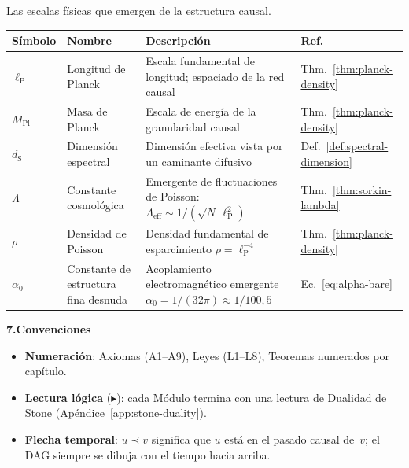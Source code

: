 \documentclass[11pt, a4paper, openany]{book}
\newcommand{\lP}{\ell_{\mathrm{P}}}
\newcommand{\dS}{d_{\mathrm{S}}}
\newcommand{\MPl}{M_{\mathrm{Pl}}}
\begin{document}
\smallskip\noindent
Las escalas f\'isicas que emergen de la estructura causal.

\smallskip
\begin{tabular}{@{}l@{\;\;}l@{\;\;}p{5.2cm}@{\;\;}l@{}}
\toprule
\textbf{S\'imbolo} & \textbf{Nombre} & \textbf{Descripci\'on} & \textbf{Ref.} \\
\midrule
$\lP$ & Longitud de Planck &
  Escala fundamental de longitud; espaciado de la red causal &
  Thm.~\ref{thm:planck-density} \\[3pt]
$\MPl$ & Masa de Planck &
  Escala de energ\'ia de la granularidad causal &
  Thm.~\ref{thm:planck-density} \\[3pt]
$\dS$ & Dimensi\'on espectral &
  Dimensi\'on efectiva vista por un caminante difusivo &
  Def.~\ref{def:spectral-dimension} \\[3pt]
$\Lambda$ & Constante cosmol\'ogica &
  Emergente de fluctuaciones de Poisson:
  $\Lambda_{\text{eff}} \sim 1/(\sqrt{N}\,\lP^2)$ &
  Thm.~\ref{thm:sorkin-lambda} \\[3pt]
$\rho$ & Densidad de Poisson &
  Densidad fundamental de esparcimiento $\rho = \lP^{-4}$ &
  Thm.~\ref{thm:planck-density} \\[3pt]
$\alpha_0$ & Constante de estructura fina desnuda &
  Acoplamiento electromagn\'etico emergente
  $\alpha_0 = 1/(32\pi) \approx 1/100{,}5$ &
  Ec.~\eqref{eq:alpha-bare} \\
\bottomrule
\end{tabular}

\bigskip

\normalsize
{\bfseries\color{structure} 7.\quad Convenciones}

\smallskip
\begin{itemize}[leftmargin=1.5em, itemsep=3pt]
  \item \textbf{Numeraci\'on}: Axiomas (A1--A9), Leyes (L1--L8),
        Teoremas numerados por cap\'itulo.
  \item \textbf{Lectura l\'ogica} ($\blacktriangleright$): cada
        M\'odulo termina con una lectura de Dualidad de Stone
        (Ap\'endice~\ref{app:stone-duality}).
  \item \textbf{Flecha temporal}: $u \prec v$ significa que $u$
        est\'a en el pasado causal de~$v$; el DAG siempre se
        dibuja con el tiempo hacia arriba.
\end{itemize}

\end{document}

